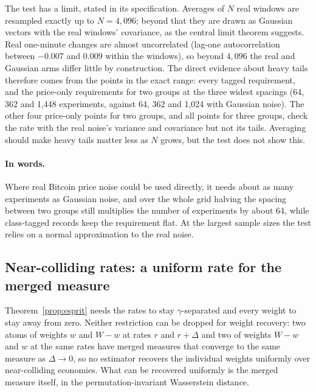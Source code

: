 The test has a limit, stated in its specification. Averages of $N$ real windows are resampled exactly up to $N=4{,}096$; beyond that they are drawn as Gaussian vectors with the real windows' covariance, as the central limit theorem suggests. Real one-minute changes are almost uncorrelated (lag-one autocorrelation between $-0.007$ and $0.009$ within the windows), so beyond $4{,}096$ the real and Gaussian arms differ little by construction. The direct evidence about heavy tails therefore comes from the points in the exact range: every tagged requirement, and the price-only requirements for two groups at the three widest spacings (64, 362 and 1{,}448 experiments, against 64, 362 and 1{,}024 with Gaussian noise). The other four price-only points for two groups, and all points for three groups, check the rate with the real noise's variance and covariance but not its tails. Averaging should make heavy tails matter less as $N$ grows, but the test does not show this.

\paragraph{In words.} Where real Bitcoin price noise could be used directly, it needs about as many experiments as Gaussian noise, and over the whole grid halving the spacing between two groups still multiplies the number of experiments by about 64, while class-tagged records keep the requirement flat. At the largest sample sizes the test relies on a normal approximation to the real noise.

\subsection{Near-colliding rates: a uniform rate for the merged measure}\label{sec:uniform}

Theorem~\ref{prop:esprit} needs the rates to stay $\gamma$-separated and every weight to stay away from zero. Neither restriction can be dropped for weight recovery: two atoms of weights $w$ and $W-w$ at rates $r$ and $r+\Delta$ and two of weights $W-w$ and $w$ at the same rates have merged measures that converge to the same measure as $\Delta\to0$, so no estimator recovers the individual weights uniformly over near-colliding economies. What can be recovered uniformly is the merged measure itself, in the permutation-invariant Wasserstein distance.

